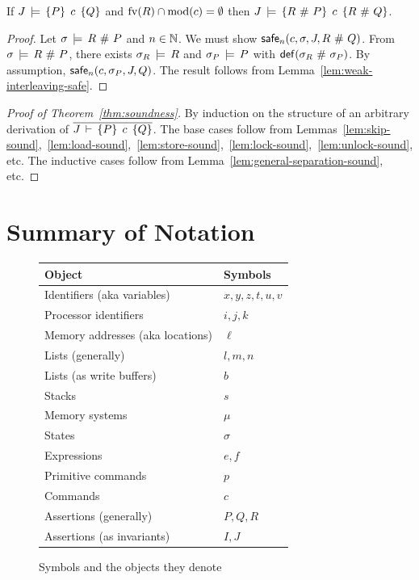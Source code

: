 \documentclass[11pt]{report}
\begin{document}
\begin{lemma}
  \label{lem:general-separation-sound}
	If $J\,\models\,\left\lbrace P \right\rbrace\;c\;\left\lbrace Q \right\rbrace$ and $\mathrm{fv}(R) \cap \mathrm{mod}(c) = \operatorname{\emptyset}$ then $J\,\models\,\left\lbrace R \operatorname{\,\#\,} P \right\rbrace\;c\;\left\lbrace R \operatorname{\,\#\,} Q \right\rbrace$. 
\end{lemma}

\begin{proof}
	Let $\sigma \,\models\, R \operatorname{\,\#\,} P$ and $n \in \mathbb{N}$. We must show $\mathsf{safe}_{n}(c,\sigma,J,R\operatorname{\,\#\,} Q)$. From $\sigma \,\models\, R \operatorname{\,\#\,} P$, there exists $\sigma_R \,\models\, R$ and $\sigma_P \,\models\, P$ with $\mathsf{def}(\sigma_R \operatorname{\,\#\,} \sigma_P)$. By assumption, $\mathsf{safe}_{n}(c,\sigma_P,J,Q)$. The result follows from Lemma~\ref{lem:weak-interleaving-safe}. 
\end{proof}

\begin{proof}[Proof of Theorem~\ref{thm:soundness}]

By induction on the structure of an arbitrary derivation of $\overline{J\,\vdash\,\left\lbrace P \right\rbrace\;c\;\left\lbrace Q \right\rbrace}$. The base cases follow from Lemmas~\ref{lem:skip-sound},~\ref{lem:load-sound},~\ref{lem:store-sound},~\ref{lem:lock-sound},~\ref{lem:unlock-sound}, etc. The inductive cases follow from Lemma~\ref{lem:general-separation-sound}, etc. 

\end{proof}

\section{Summary of Notation}

\begin{figure}
\centering
\begin{tabular}{l|l}
Object & Symbols \\  
\hline 
Identifiers (aka variables) & $x,y,z,t,u,v$ \\
Processor identifiers & $i,j,k$ \\ 
Memory addresses (aka locations) & $\ell$ \\ 
Lists (generally) & $l,m,n$ \\ 
Lists (as write buffers) & $b$ \\ 
Stacks & $s$ \\ 
Memory systems & $\mu$ \\ 
States & $\sigma$ \\ 
Expressions & $e,f$ \\ 
Primitive commands & $p$ \\
Commands & $c$ \\ 
Assertions (generally) & $P,Q,R$ \\
Assertions (as invariants) & $I,J$ \\
\end{tabular}
\caption{Symbols and the objects they denote\label{fig:objects-and-symbols}}
\end{figure}
\end{document}
